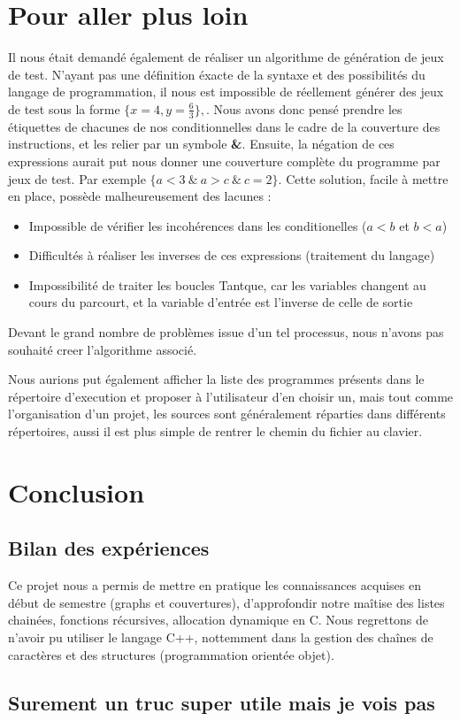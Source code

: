 \documentclass[a4paper,11pt]{article}
\begin{document}
	\section{Pour aller plus loin}
	Il nous était demandé également de réaliser un algorithme de génération de jeux de test. N'ayant pas une définition éxacte de la syntaxe et des possibilités du langage de programmation, il nous est impossible de réellement générer des jeux de test sous la forme $\{x=4,y=\frac{6}{3}\}, $. Nous avons donc pensé prendre les étiquettes de chacunes de nos conditionnelles dans le cadre de la couverture des instructions, et les relier par un symbole \textbf{\&}. Ensuite, la négation de ces expressions aurait put nous donner une couverture complète du programme par jeux de test. Par exemple $\{a<3\ \&\ a>c\ \&\ c=2\}$. Cette solution, facile à mettre en place, possède malheureusement des lacunes :
	\begin{itemize}
	\item Impossible de vérifier les incohérences dans les conditionelles ($a<b$ et $b<a$)
	\item Difficultés à réaliser les inverses de ces expressions (traitement du langage)
	\item Impossibilité de traiter les boucles Tantque, car les variables changent au cours du parcourt, et la variable d'entrée est l'inverse de celle de sortie
	\end{itemize}
	Devant le grand nombre de problèmes issue d'un tel processus, nous n'avons pas souhaité creer l'algorithme associé.
	
	Nous aurions put également afficher la liste des programmes présents dans le répertoire d'execution et proposer à l'utilisateur d'en choisir un, mais tout comme l'organisation d'un projet, les sources sont généralement réparties dans différents répertoires, aussi il est plus simple de rentrer le chemin du fichier au clavier.
	\section{Conclusion}
	\subsection{Bilan des expériences}
		Ce projet nous a permis de mettre en pratique les connaissances acquises en début de semestre (graphs et couvertures), d'approfondir notre maîtise des listes chainées, fonctions récursives, allocation dynamique en C. Nous regrettons de n'avoir pu utiliser le langage C++, nottemment dans la gestion des chaînes de caractères et des structures (programmation orientée objet).
	 \subsection{Surement un truc super utile mais je vois pas}
\end{document}
